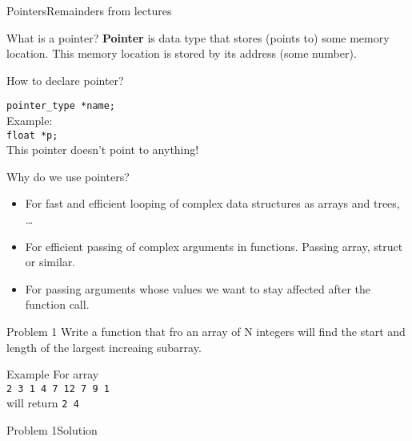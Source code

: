 

\begin{frame}[fragile,shrink=10]{Pointers}{Remainders from lectures}
  \begin{block}{What is a pointer?}
    \textbf{Pointer} is \alert{data type} that stores (points to) some memory
    location. This memory location is stored by its address (some number).
  \end{block}
  \begin{block}{How to declare pointer?}
  
    \texttt{pointer\_type *name;}\\
    Example:\\
    \texttt{float *p;}\\
    \alert{This pointer doesn't point to anything!}
  \end{block}
  \begin{block}{Why do we use pointers?}
    \begin{itemize}
      \item For fast and efficient looping of complex data structures as arrays
      and trees, \ldots
      \item For efficient passing of complex arguments in functions. Passing
      array, struct or similar.
      \item For passing arguments whose values we want to stay affected after
      the function call.
    \end{itemize}
  \end{block}
  
\end{frame}

\begin{frame}{Problem 1}
Write a function that fro an array of N integers will find the start and length
of the largest increaing subarray.
\begin{exampleblock}{Example}
For array\\
\texttt{2 3 {\color{red}1 4 7 12} 7 9 1}\\
will return \texttt{2 4}
\end{exampleblock}
\end{frame}

\begin{frame}[fragile]{Problem 1}{Solution}
\begin{columns}


\end{columns}
\end{frame}


